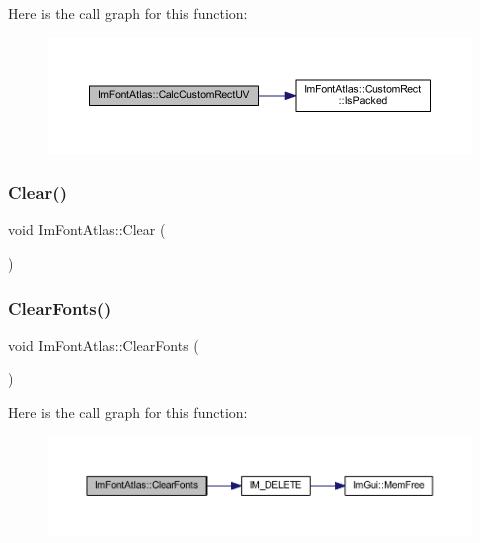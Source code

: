 Here is the call graph for this function\+:
\nopagebreak
\begin{figure}[H]
\begin{center}
\leavevmode
\includegraphics[width=350pt]{struct_im_font_atlas_a70e062104b11a213eb3d177151c418e2_cgraph}
\end{center}
\end{figure}
\mbox{\label{struct_im_font_atlas_a8f6d01c671d8670f991ba651bbaf7e77}} 
\subsubsection{\texorpdfstring{Clear()}{Clear()}}
{\footnotesize\ttfamily void Im\+Font\+Atlas\+::\+Clear (\begin{DoxyParamCaption}{ }\end{DoxyParamCaption})}

\mbox{\label{struct_im_font_atlas_ad5c2560d708bd0c389e9bd9da2d9b055}} 
\subsubsection{\texorpdfstring{Clear\+Fonts()}{ClearFonts()}}
{\footnotesize\ttfamily void Im\+Font\+Atlas\+::\+Clear\+Fonts (\begin{DoxyParamCaption}{ }\end{DoxyParamCaption})}

Here is the call graph for this function\+:
\nopagebreak
\begin{figure}[H]
\begin{center}
\leavevmode
\includegraphics[width=350pt]{struct_im_font_atlas_ad5c2560d708bd0c389e9bd9da2d9b055_cgraph}
\end{center}
\end{figure}
\mbox{\label{struct_im_font_atlas_a3f5bcbb7a2683b1af106fcf4e1217662}} 

